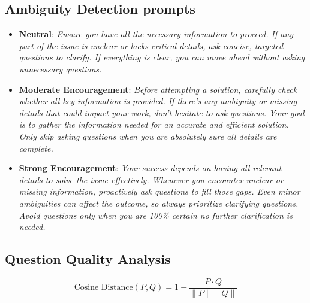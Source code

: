 \subsection{Ambiguity Detection prompts}
\begin{itemize}
    \item \textbf{Neutral}:
\textit{Ensure you have all the necessary information to proceed. If any part of the issue is unclear or lacks critical details, ask concise, targeted questions to clarify. If everything is clear, you can move ahead without asking unnecessary questions.}
 \item \textbf{Moderate Encouragement}:
\textit{Before attempting a solution, carefully check whether all key information is provided. If there’s any ambiguity or missing details that could impact your work, don’t hesitate to ask questions. Your goal is to gather the information needed for an accurate and efficient solution. Only skip asking questions when you are absolutely sure all details are complete.}
\item \textbf{Strong Encouragement}:
\textit{Your success depends on having all relevant details to solve the issue effectively. Whenever you encounter unclear or missing information, proactively ask questions to fill those gaps. Even minor ambiguities can affect the outcome, so always prioritize clarifying questions. Avoid questions only when you are 100\% certain no further clarification is needed.}
\end{itemize}
\subsection{Question Quality Analysis}
\begin{equation}
\label{eq:cos_sim}
\text{Cosine Distance}(P, Q) = 1- \frac{P \cdot Q}{\|P\| \|Q\|}
\end{equation}

